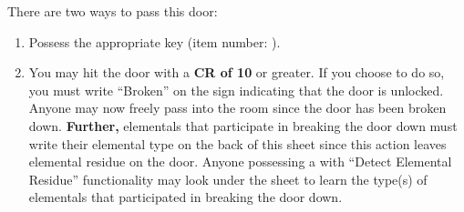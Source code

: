 \documentclass[green]{elementals}
\begin{document}
\name{\gLockedDoorAccess{}}%

There are two ways to pass this door:
\begin{enumerate}
 \item Possess the appropriate key (item number: \iLabKey{\MYnumber}).
 \item You may hit the door with a {\bf CR of 10} or greater. If you choose to do so, you must write ``Broken'' on the sign indicating that the door is unlocked. Anyone may now freely pass into the room since the door has been broken down. {\bf Further,} elementals that participate in breaking the door down must write their elemental type on the back of this sheet since this action leaves elemental residue on the door. Anyone possessing a \iTricorder{} with ``Detect Elemental Residue'' functionality may look under the sheet to learn the type(s) of elementals that participated in breaking the door down.
\end{enumerate}
  
\end{document}
